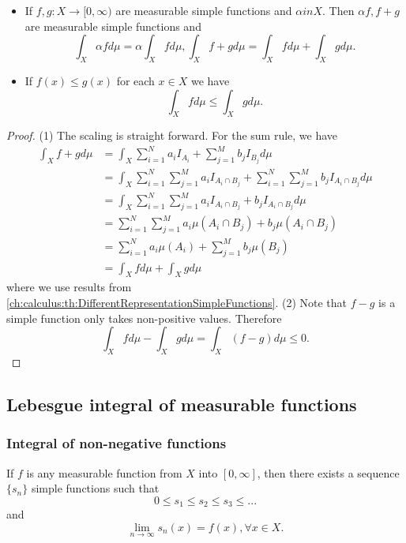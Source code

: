 \begin{refsection}
\begin{theorem}\hfill
\begin{itemize}
	\item If $f,g: X\to [0,\infty)$ are measurable simple functions and $\alpha in X$. Then $\alpha f, f+g$ are measurable simple functions and 
	$$\int_X \alpha f d\mu = \alpha \int_X f d\mu, \int_X  f+g d\mu = \int_X f d\mu + \int_X g d\mu.$$ 	
	\item If $f(x) \leq g(x)$ for each $x\in X$ we have $$\int_X fd\mu \leq \int_X g d\mu.$$
\end{itemize}		
\end{theorem}
\begin{proof}
(1) The scaling is straight forward. For the sum rule, we have
\begin{align*}
\int_X  f+g d\mu &= \int_X  \sum_{i=1}^N a_i I_{A_i} + \sum_{j=1}^M b_j I_{B_j} d\mu \\
& =\int_X  \sum_{i=1}^N\sum_{j=1}^M a_i I_{A_i\cap B_j} + \sum_{i=1}^N\sum_{j=1}^M b_j I_{A_i\cap B_j} d\mu \\
& =\int_X  \sum_{i=1}^N\sum_{j=1}^M a_i I_{A_i\cap B_j} +  b_j I_{A_i\cap B_j} d\mu \\
& = \sum_{i=1}^N\sum_{j=1}^M a_i \mu(A_i\cap B_j) +  b_j \mu(A_i\cap B_j) \\
& = \sum_{i=1}^N a_i \mu(A_i) + \sum_{j=1}^M b_j \mu(B_j) \\
& = \int_X fd\mu + \int_X gd\mu
\end{align*}
where we use results from \autoref{ch:calculus:th:DifferentRepresentationSimpleFunctions}.
(2) 
Note that $f-g$ is a simple function only takes non-positive values. Therefore 
$$\int_X f d\mu - \int_X g d\mu = \int_X (f-g) d\mu \leq 0.$$
\end{proof}

\subsection{Lebesgue integral of measurable functions}

\subsubsection{Integral of non-negative functions}

\begin{theorem}
	If $f$ is any measurable function from $X$ into $[0,\infty]$, then there exists a sequence $\{s_n\}$ simple functions such that \cite{johnsonbaugh2010foundations}
	$$0\leq s_1 \leq s_2 \leq s_3 \leq ...$$
	and
	$$\lim_{n\rightarrow \infty} s_n(x) = f(x),\forall x\in X.$$
\end{theorem}


\end{refsection}
